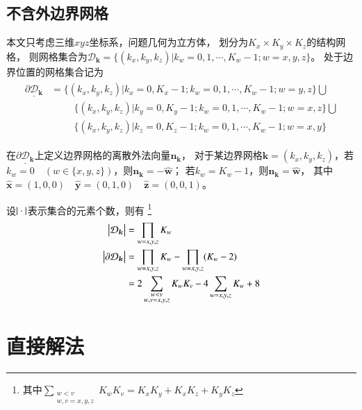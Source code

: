 \subsection{不含外边界网格}

本文只考虑三维$xyz$坐标系，问题几何为立方体，
划分为$K_x\times K_y \times K_z$的结构网格，
则网格集合为$\mathcal{D}_{\bm{k}}=\big\{(k_x,k_y,k_z)\big|k_w = 0,1,\cdots,K_w-1 ; w=x,y,z\big\}$。
处于边界位置的网格集合记为
\begin{align}
  \begin{aligned}
  \underline{\partial \mathcal{D}_{\bm{k}}}
  &=\big\{(k_x,k_y,k_z)\big|k_x=0,K_x-1;k_w = 0,1,\cdots,K_w-1 ; w=y,z\big\}
  \bigcup\\
  &\hspace{1cm}
  \big\{(k_x,k_y,k_z)\big|k_y=0,K_y-1;k_w = 0,1,\cdots,K_w-1 ; w=x,z\big\}
  \bigcup\\
  &\hspace{1cm}
  \big\{(k_x,k_y,k_z)\big|k_z=0,K_z-1;k_w = 0,1,\cdots,K_w-1 ; w=x,y\big\}
  \end{aligned}
\end{align}

\TODO 在$\underline{\partial \mathcal{D}_{\bm{k}}}$上定义边界网格的离散外法向量$\bm{n}_{\bm{k}}$，
对于某边界网格$\bm{k}=(k_x,k_y,k_z)$，若$k_w=0 \quad (w\in\{x,y,z\})$，则$\bm{n}_{\bm{k}}=-\hat{\bm{w}}$；
若$k_w=K_w-1$，则$\bm{n}_{\bm{k}}=\hat{\bm{w}}$，
其中$\hat{\bm{x}}=(1,0,0) \quad \hat{\bm{y}}=(0,1,0) \quad \hat{\bm{z}}=(0,0,1)$。

设$\vb{\cdot}$表示集合的元素个数，则有
\footnote{其中$\sum_{ \substack{w<v \\ w,v=x,y,z} } K_wK_v = K_xK_y+K_xK_z+K_yK_z$}
\begin{align}
  \begin{aligned}
    \vb[b]{\mathcal{D}_{\bm{k}}} &= \prod_{w=x,y,z}K_w\\
    \vb[b]{\partial \mathcal{D}_{\bm{k}}} 
      &= \prod_{w=x,y,z}K_w - \prod_{w=x,y,z}\pb{K_w-2} \\
      &= 2\sum_{ \substack{w<v \\ w,v=x,y,z} } K_wK_v
        -4\sum_{w=x,y,z}K_w
        +8
  \end{aligned}
\end{align}




\section{直接解法}

